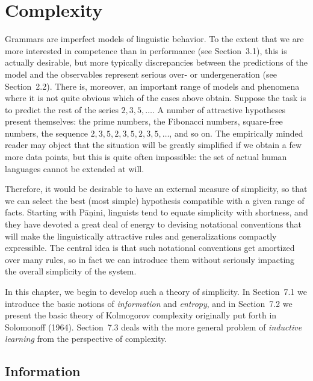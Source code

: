 \chapter{Complexity}

\noindent
Grammars are imperfect models of linguistic behavior. To the extent that we
are more interested in competence than in performance (see Section~3.1), this
is actually desirable, but more typically discrepancies between the
predictions of the model and the observables represent serious over- or
undergeneration (see Section~2.2). There is, moreover, an important range of
models and phenomena where it is not quite obvious which of the cases above
obtain. Suppose the task is to predict the rest of the series $2,3,5,\ldots$. A
number of attractive hypotheses present themselves: the prime numbers, the
Fibonacci numbers, square-free numbers, the sequence
$2,3,5,2,3,5,2,3,5,\ldots$, and so on. The empirically minded reader may object
that the situation will be greatly simplified if we obtain a few more
data points, but this is quite often impossible: the set of actual human
languages cannot be extended at will.  

Therefore, it would be desirable to have an external measure of simplicity, so
that we can select the best (most simple) hypothesis compatible with a given
range of facts. Starting with P\={a}\d{n}ini, linguists
tend to equate simplicity with shortness, and they have devoted a great deal
of energy to devising notational conventions that will make the linguistically
attractive rules and generalizations compactly expressible. The central idea
is that such notational conventions get amortized over many rules, so in fact
we can introduce them without seriously impacting the overall simplicity of
the system. 

In this chapter, we begin to develop such a theory of simplicity.  In
Section~7.1 we introduce the basic notions of {\it information} and {\it
  entropy}, and in Section~7.2 we present the basic theory of Kolmogorov
complexity originally put forth in Solomonoff (1964). Section~7.3 deals with
the more general problem of {\it inductive learning} from the perspective of
complexity.\nocite{Solomonoff:1964}

\section{Information}

